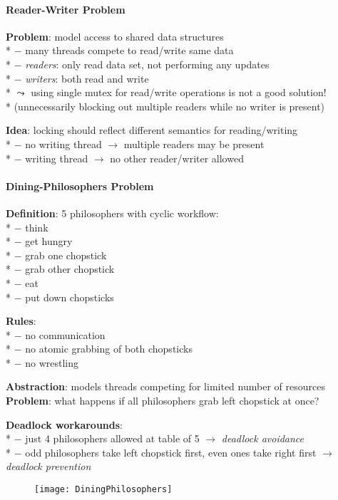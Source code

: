 \paragraph{Reader-Writer Problem}
\begin{items}
  \item \textbf{Problem}: model access to shared data structures \\*
    $ - $ many threads compete to read/write same data \\*
    $ - $ \emph{readers}: only read data set, not performing any updates \\*
    $ - $ \emph{writers}: both read and write \\*
    $ \leadsto $ using single mutex for read/write operations is not a good solution! \\*
    \phantom{$ \leadsto $} (unnecessarily blocking out multiple readers while no writer is present)
  \item \textbf{Idea}: locking should reflect different semantics for reading/writing \\*
  $ - $ no writing thread $ \to $ multiple readers may be present \\*
  $ - $ writing thread $ \to $ no other reader/writer allowed
\end{items}

\paragraph{Dining-Philosophers Problem}
\begin{items}
  \item \textbf{Definition}: 5 philosophers with cyclic workflow: \\*
    $ - $ think \\*
    $ - $ get hungry \\*
    $ - $ grab one chopstick \\*
    $ - $ grab other chopstick \\*
    $ - $ eat \\*
    $ - $ put down chopsticks
  \item \textbf{Rules}: \\*
    $ - $ no communication \\*
    $ - $ no atomic grabbing of both chopsticks \\*
    $ - $ no wrestling
  \item \textbf{Abstraction}: models threads competing for limited number of resources
  \textbf{Problem}: what happens if all philosophers grab left chopstick at once?
  \item \textbf{Deadlock workarounds}:  \\*
    $ - $ just 4 philosophers allowed at table of 5 $ \to $ \emph{deadlock avoidance} \\*
    $ - $ odd philosophers take left chopstick first, even ones take right first $ \to $ \emph{deadlock prevention}
\end{items}
\begin{figure}[H]\centering\label{DiningPhilosophers}\texttt{[image: DiningPhilosophers]}\end{figure}

